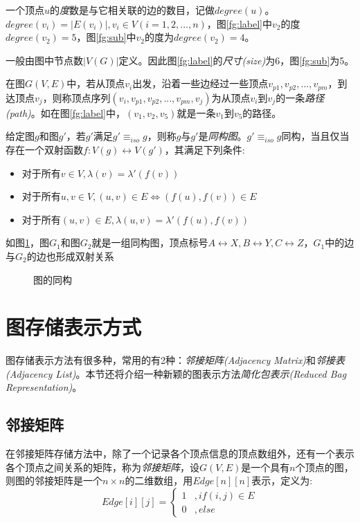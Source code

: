 \documentclass{XDBAthesis}
\begin{document}
\begin{defn}[顶点的度]\cite{GraphAlgorithm}
    一个顶点$u$的\emph{度}数是与它相关联的边的数目，记做$degree(u)$。$degree(v_i )=|E(v_i )|,v_i \in V(i=1,2,...,n)$，图\ref{fg:label}中$v_2 $的度$degree(v_2 )=5$，图\ref{fg:sub}中$v_2 $的度为$degree(v_2)=4$。
\end{defn}
\begin{defn}[图的尺寸]\cite{g13}
    一般由图中节点数$|V(G)|$定义。因此图\ref{fg:label}的\emph{尺寸(size)}为6，图\ref{fg:sub}为5。
\end{defn}
\begin{defn}[路径]\cite{GraphAlgorithm}
在图$G(V,E)$中，若从顶点$v_i$出发，沿着一些边经过一些顶点$v_{p1},v_{p2},...,v_{pm}$，到达顶点$v_j $，则称顶点序列$(v_{i},v_{p1},v_{p2},...,v_{pm},v_{j})$为从顶点$v_i $到$v_j $的一条\emph{路径(path)}。如在图\ref{fg:label}中，$(v_{1},v_{2},v_{5})$就是一条$v_1 $到$v_5 $的路径。  
\end{defn}
\begin{defn}[图的同构]\cite{g13}
给定图$g$和图$g'$，若$g'$满足$g'\equiv_{iso}g$，则称$g$与$g'$是\emph{同构图}。$g'\equiv_{iso}g$同构，当且仅当存在一个双射函数$f:V(g)\leftrightarrow V(g')$，其满足下列条件:
\begin{itemize}
    \item 对于所有$v\in V,\lambda(v)=\lambda '(f(v))$
    \item 对于所有$u,v\in V,(u,v)\in E\Leftrightarrow (f(u),f(v))\in E$
    \item 对于所有$(u,v)\in E,\lambda(u,v)=\lambda '(f(u),f(v)) $
\end{itemize}  
\end{defn}
如图\ref{fg:iso}，图$G_1$和图$G_2$就是一组同构图，顶点标号$A\leftrightarrow X,B\leftrightarrow Y,C\leftrightarrow Z$，$G_1$中的边与$G_2$的边也形成双射关系
\begin{figure}[htb]
    \centering
    \subfigure[$G_1$]{
        
    }
    \subfigure[$G_2$]{
        
    }
    \caption{图的同构}
    \label{fg:iso}
\end{figure}

\section{图存储表示方式}
图存储表示方法有很多种，常用的有2种：\emph{邻接矩阵(Adjacency Matrix)}和\emph{邻接表(Adjacency List)}。本节还将介绍一种新颖的图表示方法\emph{简化包表示(Reduced Bag Representation)}\cite{ghash}。
\subsection{邻接矩阵}
 在邻接矩阵存储方法中，除了一个记录各个顶点信息的顶点数组外，还有一个表示各个顶点之间关系的矩阵，称为\emph{邻接矩阵}\cite{GraphAlgorithm}，设$G(V,E)$是一个具有$n$个顶点的图，则图的邻接矩阵是一个$n\times n$的二维数组，用$Edge[n][n]$表示，定义为:
\begin{equation}
    Edge[i][j]=\left\{
    \begin{aligned}
        1 & , if (i,j)\in E \\
        0 & , else    
    \end{aligned}\right. 
\end{equation}
\end{document}
